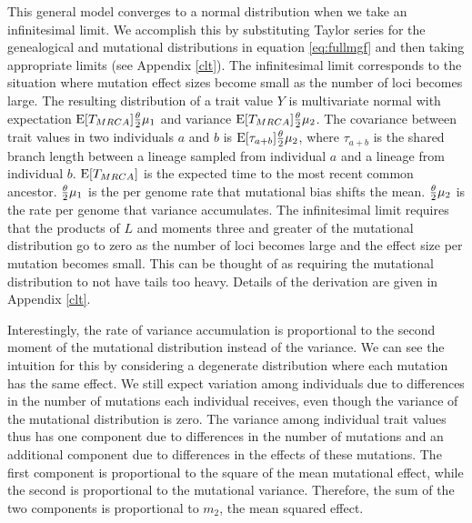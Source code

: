 This general model converges to a normal distribution when we take an
infinitesimal limit. We accomplish this by substituting Taylor series for the
genealogical and mutational distributions in equation \eqref{eq:fullmgf} and
then taking appropriate limits (see Appendix \ref{clt}). The infinitesimal limit
corresponds to the situation where mutation effect sizes become small as the
number of loci becomes large. The resulting distribution of a trait value $Y$ is
multivariate normal with expectation $\mathrm{E}[T_{MRCA}] \frac{\theta}{2} \mu_1$ and variance
$\mathrm{E}[T_{MRCA}] \frac{\theta}{2} \mu_2$. The covariance between trait values in two individuals
$a$ and $b$ is $\mathrm{E}[\tau_{a+b}] \frac{\theta}{2} \mu_2$, where $\tau_{a+b}$ is the shared
branch length between a lineage sampled from individual $a$ and a lineage from
individual $b$. $\mathrm{E}[T_{MRCA}]$ is the expected time to the most recent common
ancestor. $\frac{\theta}{2} \mu_1$ is the per genome rate that mutational bias shifts the
mean. $\frac{\theta}{2} \mu_2$ is the rate per genome that variance accumulates. The
infinitesimal limit requires that the products of $L$ and moments three and
greater of the mutational distribution go to zero as the number of loci becomes
large and the effect size per mutation becomes small. This can be thought of as
requiring the mutational distribution to not have tails too heavy. Details of
the derivation are given in Appendix \ref{clt}.

Interestingly, the rate of variance accumulation is proportional to the second
moment of the mutational distribution instead of the variance. We can see the
intuition for this by considering a degenerate distribution where each mutation
has the same effect. We still expect variation among individuals due to
differences in the number of mutations each individual receives, even though the
variance of the mutational distribution is zero. The variance among individual
trait values thus has one component due to differences in the number of
mutations and an additional component due to differences in the effects of these
mutations. The first component is proportional to the square of the mean
mutational effect, while the second is proportional to the mutational variance.
Therefore, the sum of the two components is proportional to $m_2$, the mean
squared effect.


